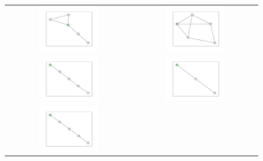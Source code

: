 \documentclass[12pt, a4paper]{extarticle}
\begin{document}
\begin{figure}\centering\begin{tabularx}{\textwidth}{cc}
\includegraphics[width=0.5\textwidth]{task11-graphlets/5_21-18-25-19-23.pdf} &
\includegraphics[width=0.5\textwidth]{task11-graphlets/5_21-25-22-23-24.pdf} \\
\includegraphics[width=0.5\textwidth]{task11-graphlets/5_5-10-16-18-23.pdf} &
\includegraphics[width=0.5\textwidth]{task11-graphlets/3_21-22-23.pdf} \\
\includegraphics[width=0.5\textwidth]{task11-graphlets/5_14-16-21-17-23.pdf} &

\end{tabularx}
\end{figure}
\end{document}
